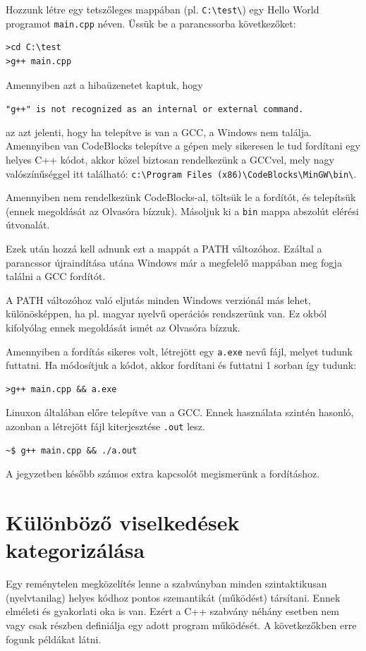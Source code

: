 \documentclass[a4paper,11.5pt,table]{article}
\begin{document}
	Hozzunk létre egy tetszőleges mappában (pl. \texttt{C:\textbackslash test\textbackslash}) egy Hello World programot \texttt{main.cpp} néven. Üssük be a parancssorba következőket:
	\begin{lstlisting}
>cd C:\test
>g++ main.cpp
	\end{lstlisting}
	Amennyiben azt a hibaüzenetet kaptuk, hogy 
	
	{\centering\texttt{"g++" is not recognized as an internal or external command.}\par}
	
	az azt jelenti, hogy ha telepítve is van a GCC, a Windows nem találja. Amennyiben van CodeBlocks telepítve a gépen mely sikeresen le tud fordítani egy helyes C++ kódot, akkor közel biztosan rendelkezünk a GCCvel, mely nagy valószínűséggel itt található: \texttt{c:\textbackslash Program Files (x86)\textbackslash CodeBlocks\textbackslash MinGW\textbackslash bin\textbackslash }.
	 
	Amennyiben nem rendelkezünk CodeBlocks-al, töltsük le a fordítót, és telepítsük (ennek megoldását az Olvasóra bízzuk). Másoljuk ki a \texttt{bin} mappa abszolút elérési útvonalát.
	 
	Ezek után hozzá kell adnunk ezt a mappát a PATH változóhoz. Ezáltal a parancssor újraindítása utána Windows már a megfelelő mappában meg fogja találni a GCC fordítót.
	\begin{note}
	 	A PATH változóhoz való eljutás minden Windows verziónál más lehet, különösképpen, ha pl. magyar nyelvű operációs rendszerünk van. Ez okból kifolyólag ennek megoldását ismét az Olvasóra bízzuk.
	\end{note}
	Amennyiben a fordítás sikeres volt, létrejött egy \texttt{a.exe} nevű fájl, melyet tudunk futtatni. Ha módosítjuk a kódot, akkor fordítani és futtatni 1 sorban így tudunk:
	\begin{lstlisting}
>g++ main.cpp && a.exe
	\end{lstlisting}
	Linuxon általában előre telepítve van a GCC. Ennek használata szintén hasonló, azonban a létrejött fájl kiterjesztése \texttt{.out} lesz.
	\begin{lstlisting}
~$ g++ main.cpp && ./a.out
	\end{lstlisting}
	A jegyzetben később számos extra kapcsolót megismerünk a fordításhoz.

	\section{Különböző viselkedések kategorizálása}
	Egy reménytelen megközelítés lenne a szabványban minden szintaktikusan (nyelvtanilag) helyes kódhoz pontos szemantikát (működést) társítani. Ennek  elméleti és gyakorlati oka is van. Ezért a C++ szabvány néhány esetben nem vagy csak részben definiálja egy adott program működését. A következőkben erre fogunk példákat látni.
\end{document}

